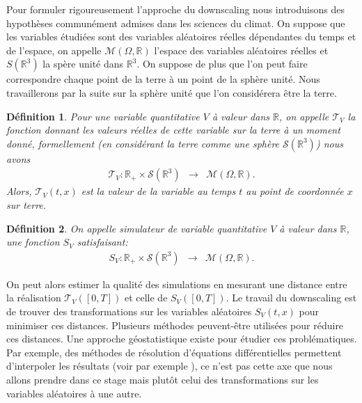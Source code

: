 \documentclass[a4paper,11pt]{article}
\numberwithin{equation}{section}
\newtheorem{definition}{Définition}
\begin{document}
\vspace{0.7cm}

Pour formuler rigoureusement l'approche du downscaling nous introduisons des hypothèses communément admises dans les sciences du climat. On suppose que les variables étudiées sont des variables aléatoires réelles dépendantes du temps et de l'espace, on appelle $\mathcal{M}(\Omega,\mathbb{R})$ l'espace des variables aléatoires réelles et $S(\mathbb{R}^3)$ la spère unité dans $\mathbb{R}^3$. On suppose de plus que l'on peut faire correspondre chaque point de la terre à un point de la sphère unité. Nous travaillerons par la suite sur la sphère unité que l'on considérera être la terre.

\begin{definition}
	\label{terre}
	Pour une variable quantitative $V$ à valeur dans $\mathbb{R}$, on appelle $\mathcal{T}_V$ la fonction donnant les  valeurs réelles de cette variable sur la terre à un moment donné, formellement (en considérant la terre comme une sphère $\mathcal{S}(\mathbb{R}^3)$) nous avons
	\begin{equation}
		\label{eq-terre-mod}
		\begin{array}{ccc}
			\mathcal{T}_V: \mathbb{R}_{+}\times\mathcal{S}(\mathbb{R}^{3}) & \to & \mathcal{M}(\Omega,\mathbb{R}).
		\end{array}
	\end{equation}
	Alors, $\mathcal{T}_V(t,x)$ est la valeur de la variable au temps $t$ au point de coordonnée $x$ sur terre.	
\end{definition}

\begin{definition}
	\label{simu_terre}
	On appelle simulateur de variable quantitative $V$ à valeur dans $\mathbb{R}$, une fonction $S_V$ satisfaisant:
	\begin{equation}
		\begin{array}{ccc}
			S_V: \mathbb{R}_{+}\times\mathcal{S}(\mathbb{R}^{3}) & \to & \mathcal{M}(\Omega,\mathbb{R}).
		\end{array}
	\end{equation}
\end{definition}
On peut alors estimer la qualité des simulations en mesurant une distance entre la réalisation $\mathcal{T}_V([0,T])$ et celle de $S_V([0,T])$. Le travail du downscaling est de trouver des transformations sur les variables aléatoires $S_V(t,x)$ pour minimiser ces distances. Plusieurs méthodes peuvent-être utilisées pour réduire ces distances. Une approche géostatistique  existe pour étudier ces problématiques. Par exemple, des méthodes de résolution d'équations différentielles permettent d'interpoler les résultats (voir par exemple \cite{lindgren2011explicit}), ce n'est pas cette axe que nous allons prendre dans ce stage mais plutôt celui des transformations sur les variables aléatoires à une autre.
\end{document}
